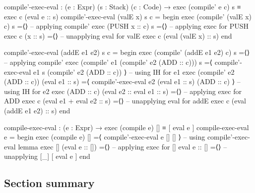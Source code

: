 \documentclass[a4paper,UKenglish]{tufte-handout}
\theoremstyle{definition}
\begin{document}
\begin{AgdaAlign}
\begin{AgdaSuppressSpace}
\begin{fullwidth}
\begin{code}[number]
compile'-exec-eval : (e : Expr) (s : Stack) (c : Code)
  → exec (compile' e c) s ≡ exec c (eval e :: s)
compile'-exec-eval (valE x) s c =
  begin
    exec (compile' (valE x) c) s
  =⟨⟩                                                    -- applying compile'
    exec (PUSH x :: c) s
  =⟨⟩                                                    -- applying exec for PUSH
    exec c (x :: s)
  =⟨⟩                                                    -- unapplying eval for valE
    exec c (eval (valE x) :: s)
  end
\end{code}

\begin{code}[number]
compile'-exec-eval (addE e1 e2) s c =
  begin
    exec (compile' (addE e1 e2) c) s
  =⟨⟩                                                    -- applying compile'
    exec (compile' e1 (compile' e2 (ADD :: c))) s
  =⟨ compile'-exec-eval e1 s (compile' e2 (ADD :: c)) ⟩  -- using IH for e1
    exec (compile' e2 (ADD :: c)) (eval e1 :: s)
  =⟨ compile'-exec-eval e2 (eval e1 :: s) (ADD :: c) ⟩   -- using IH for e2
    exec (ADD :: c) (eval e2 :: eval e1 :: s)
  =⟨⟩                                                    -- applying exec for ADD
    exec c (eval e1 + eval e2 :: s)
  =⟨⟩                                                    -- unapplying eval for addE
    exec c (eval (addE e1 e2) :: s)
  end

\end{code}

\begin{code}[number]
compile-exec-eval : (e : Expr) → exec (compile e) [] ≡ [ eval e ]
compile-exec-eval e =
  begin
    exec (compile e) []
  =⟨ compile'-exec-eval e [] [] ⟩                        -- using compile'-exec-eval lemma
    exec [] (eval e :: [])
  =⟨⟩                                                    -- applying exec for []
    eval e :: []
  =⟨⟩                                                    -- unapplying [_]
    [ eval e ]
  end
\end{code}
\end{fullwidth}
\end{AgdaSuppressSpace}
\end{AgdaAlign}

\subsection{Section summary}
\end{document}
